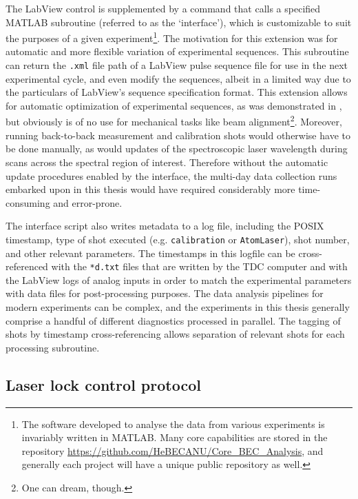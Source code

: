 	The LabView control is supplemented by a command that calls a specified MATLAB subroutine (referred to as the `interface'), which is customizable to suit the purposes of a given experiment\footnote{The software developed to analyse the data from various experiments is invariably written in MATLAB.	Many core capabilities are stored in the repository \url{https://github.com/HeBECANU/Core_BEC_Analysis}, and generally each project will have a unique public repository as well.}.
	The motivation for this extension was for automatic and more flexible variation of experimental sequences. 
	This subroutine can return the \verb|.xml| file path of a LabView pulse sequence file for use in the next experimental cycle, and even modify the sequences, albeit in a limited way due to the particulars of LabView's sequence specification format.
	This extension allows for automatic optimization of experimental sequences, as was demonstrated in \cite{Henson18_ML}, but obviously is of no use for mechanical tasks like beam alignment\footnote{One can dream, though.}.
	Moreover, running back-to-back measurement and calibration shots would otherwise have to be done manually, as would updates of the spectroscopic laser wavelength during scans across the spectral region of interest.
	Therefore without the automatic update procedures enabled by the interface, the multi-day data collection runs embarked upon in this thesis would have required considerably more time-consuming and error-prone. 
	
	The interface script also writes metadata to a log file, including the POSIX timestamp, type of shot executed (e.g.
	\verb|calibration| or \verb|AtomLaser|), shot number, and other relevant parameters.
	The timestamps in this logfile can be cross-referenced with the \verb|*d.txt| files that are written by the TDC computer and with the LabView logs of analog inputs in order to match the experimental parameters with data files for post-processing purposes.
	The data analysis pipelines for modern experiments can be complex, and the experiments in this thesis generally comprise a handful of different diagnostics processed in parallel.
	The tagging of shots by timestamp cross-referencing allows separation of relevant shots for each processing subroutine.
	
\subsection{Laser lock control protocol}

